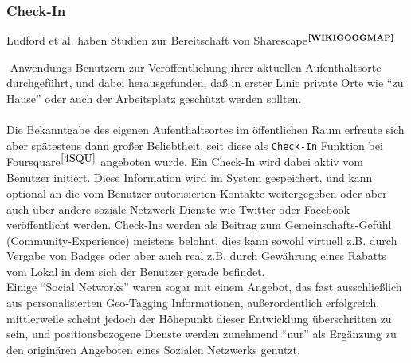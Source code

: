 \subsubsection{Check-In}
Ludford et al. haben Studien zur Bereitschaft von Sharescape$^{\textbf{\ref{WIKIGOOGMAP}}}$%
\addtocounter{footnote}{1}%
-Anwendungs-Benutzern zur Veröffentlichung ihrer aktuellen Aufenthaltsorte durchgeführt, und dabei herausgefunden, daß in erster Linie private Orte wie "`zu  Hause"' oder auch der Arbeitsplatz geschützt werden sollten.\cite{LUETAL:CSULPI}\\ \\
Die Bekanntgabe des eigenen Aufenthaltsortes im öffentlichen Raum erfreute sich aber spätestens dann großer Beliebtheit, seit diese als \texttt{Check-In} Funktion bei Foursquare$^{\ref{4SQU}}$ angeboten wurde. Ein Check-In wird dabei aktiv vom Benutzer initiert. Diese Information
wird im System gespeichert, und kann optional an die vom Benutzer autorisierten Kontakte weitergegeben oder aber auch über andere soziale Netzwerk-Dienste wie Twitter oder Facebook veröffentlicht werden.
Check-Ins werden als Beitrag zum Gemeinschafts-Gefühl (Community-Experience) meistens belohnt, dies kann sowohl virtuell z.B. durch Vergabe von Badges oder aber auch real z.B. durch Gewährung eines Rabatts vom Lokal in dem sich der Benutzer gerade befindet.\\
Einige "`Social Networks"' waren sogar mit einem Angebot, das fast ausschließlich aus personalisierten Geo-Tagging Informationen, außerordentlich erfolgreich, mittlerweile scheint jedoch der Höhepunkt dieser Entwicklung überschritten zu sein, und positionsbezogene Dienste werden zunehmend "`nur"' als Ergänzung zu den originären Angeboten eines Sozialen Netzwerks genutzt.


